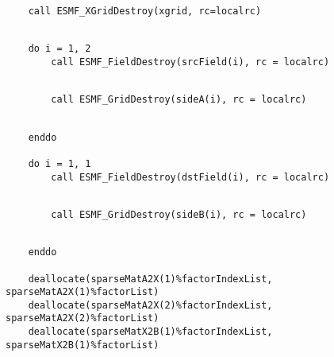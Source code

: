 
 \begin{verbatim}
    call ESMF_XGridDestroy(xgrid, rc=localrc)
 
\end{verbatim}
 

 \begin{verbatim}
    do i = 1, 2
        call ESMF_FieldDestroy(srcField(i), rc = localrc)
 
\end{verbatim}
 

 \begin{verbatim}
        call ESMF_GridDestroy(sideA(i), rc = localrc)
 
\end{verbatim}
 

 \begin{verbatim}
    enddo

    do i = 1, 1
        call ESMF_FieldDestroy(dstField(i), rc = localrc)
 
\end{verbatim}
 

 \begin{verbatim}
        call ESMF_GridDestroy(sideB(i), rc = localrc)
 
\end{verbatim}
 

 \begin{verbatim}
    enddo

    deallocate(sparseMatA2X(1)%factorIndexList, sparseMatA2X(1)%factorList)
    deallocate(sparseMatA2X(2)%factorIndexList, sparseMatA2X(2)%factorList)
    deallocate(sparseMatX2B(1)%factorIndexList, sparseMatX2B(1)%factorList)
 
\end{verbatim}

\setlength{\parskip}{\oldparskip}
\setlength{\parindent}{\oldparindent}
\setlength{\baselineskip}{\oldbaselineskip}
